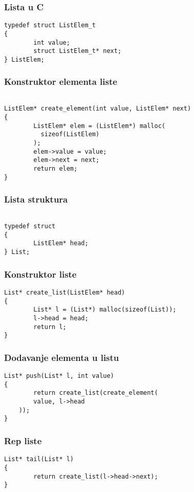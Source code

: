 \documentclass{beamer}
\begin{document}
\begin{frame}[fragile]
\frametitle{Lista u C}
\begin{lstlisting}
typedef struct ListElem_t
{
        int value;
        struct ListElem_t* next;
} ListElem;
\end{lstlisting}
\end{frame}

\begin{frame}[fragile]
\frametitle{Konstruktor elementa liste}
\begin{lstlisting}

ListElem* create_element(int value, ListElem* next)
{
        ListElem* elem = (ListElem*) malloc(
          sizeof(ListElem)
        );
        elem->value = value;
        elem->next = next;
        return elem;
}

\end{lstlisting}
\end{frame}


\begin{frame}[fragile]
\frametitle{Lista struktura}
\begin{lstlisting}

typedef struct
{
        ListElem* head;
} List;

\end{lstlisting}
\end{frame}

\begin{frame}[fragile]
\frametitle{Konstruktor liste}
\begin{lstlisting}
List* create_list(ListElem* head)
{
        List* l = (List*) malloc(sizeof(List));
        l->head = head;
        return l;
}
\end{lstlisting}
\end{frame}


\begin{frame}[fragile]
\frametitle{Dodavanje elementa u listu}
\begin{lstlisting}
List* push(List* l, int value)
{
        return create_list(create_element(
		value, l->head
	));
}
\end{lstlisting}
\end{frame}

\begin{frame}[fragile]
\frametitle{Rep liste}
\begin{lstlisting}
List* tail(List* l)
{
        return create_list(l->head->next);
}
\end{lstlisting}
\end{frame}
\end{document}
